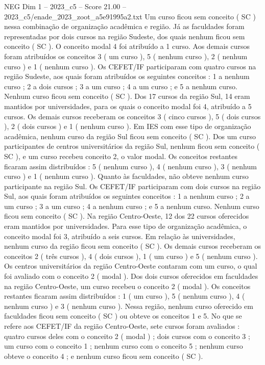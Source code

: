 \begin{textsample}{NEG Dim 1 – 2023\_c5 – Score 21.00 – 2023\_c5/enade\_2023\_zoot\_a5e91995a2.txt}
Um curso ficou sem conceito ( SC ) nessa combinação de organização acadêmica e região.
Já as faculdades foram representadas por dois cursos na região Sudeste, dos quais nenhum ficou sem conceito ( SC ).
O conceito modal 4 foi atribuído a 1 curso.
Aos demais cursos foram atribuídos os conceitos 3 ( um curso ), 5 ( nenhum curso ), 2 ( nenhum curso ) e 1 ( nenhum curso ).
Os CEFET/IF participaram com quatro cursos na região Sudeste, aos quais foram atribuídos os seguintes conceitos : 1 a nenhum curso ; 2 a dois cursos ; 3 a um curso ; 4 a um curso ; e 5 a nenhum curso.
Nenhum curso ficou sem conceito ( SC ).
Dos 17 cursos da região Sul, 14 eram mantidos por universidades, para os quais o conceito modal foi 4, atribuído a 5 cursos.
Os demais cursos receberam os conceitos 3 ( cinco cursos ), 5 ( dois cursos ), 2 ( dois cursos ) e 1 ( nenhum curso ).
Em IES com esse tipo de organização acadêmica, nenhum curso da região Sul ficou sem conceito ( SC ).
Dos um curso participantes de centros universitários da região Sul, nenhum ficou sem conceito ( SC ), e um curso recebeu conceito 2, o valor modal.
Os conceitos restantes ficaram assim distribuídos : 5 ( nenhum curso ), 4 ( nenhum curso ), 3 ( nenhum curso ) e 1 ( nenhum curso ).
Quanto às faculdades, não obteve nenhum curso participante na região Sul.
Os CEFET/IF participaram com dois cursos na região Sul, aos quais foram atribuídos os seguintes conceitos : 1 a nenhum curso ; 2 a um curso ; 3 a um curso ; 4 a nenhum curso ; e 5 a nenhum curso.
Nenhum curso ficou sem conceito ( SC ).
Na região Centro-Oeste, 12 dos 22 cursos oferecidos eram mantidos por universidades.
Para esse tipo de organização acadêmica, o conceito modal foi 3, atribuído a seis cursos.
Em relação às universidades, nenhum curso da região ficou sem conceito ( SC ).
Os demais cursos receberam os conceitos 2 ( três cursos ), 4 ( dois cursos ), 1 ( um curso ) e 5 ( nenhum curso ).
Os centros universitários da região Centro-Oeste contaram com um curso, o qual foi avaliado com o conceito 2 ( modal ).
Dos dois cursos oferecidos em faculdades na região Centro-Oeste, um curso recebeu o conceito 2 ( modal ).
Os conceitos restantes ficaram assim distribuídos : 1 ( um curso ), 5 ( nenhum curso ), 4 ( nenhum curso ) e 3 ( nenhum curso ).
Nessa região, nenhum curso oferecido em faculdades ficou sem conceito ( SC ) ou obteve os conceitos 1 e 5.
No que se refere aos CEFET/IF da região Centro-Oeste, sete cursos foram avaliados : quatro cursos deles com o conceito 2 ( modal ) ; dois cursos com o conceito 3 ; um curso com o conceito 1 ; nenhum curso com o conceito 5 ; nenhum curso obteve o conceito 4 ; e nenhum curso ficou sem conceito ( SC ).

\end{textsample}
